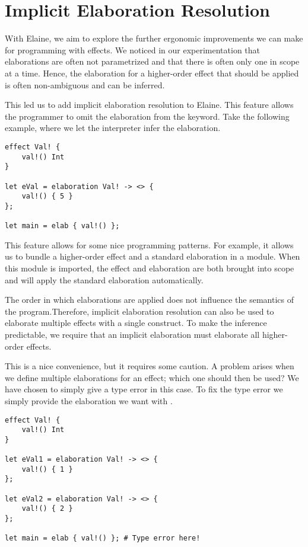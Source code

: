 \chapter{Implicit Elaboration Resolution}\label{chap:elabres}

With Elaine, we aim to explore the further ergonomic improvements we can make for programming with effects. We noticed in our experimentation that elaborations are often not parametrized and that there is often only one in scope at a time. Hence, the elaboration for a higher-order effect that should be applied is often non-ambiguous and can be inferred.

This led us to add implicit elaboration resolution to Elaine. This feature allows the programmer to omit the elaboration from the  keyword. Take the following example, where we let the interpreter infer the elaboration.

\begin{lstlisting}[language=elaine,style=fancy]
effect Val! {
    val!() Int
}

let eVal = elaboration Val! -> <> {
    val!() { 5 }
};

let main = elab { val!() };
\end{lstlisting}

This feature allows for some nice programming patterns. For example, it allows us to bundle a higher-order effect and a standard elaboration in a module. When this module is imported, the effect and elaboration are both brought into scope and  will apply the standard elaboration automatically.

The order in which elaborations are applied does not influence the semantics of the program.\citationneeded Therefore, implicit elaboration resolution can also be used to elaborate multiple effects with a single  construct. To make the inference predictable, we require that an implicit elaboration must elaborate all higher-order effects.

This is a nice convenience, but it requires some caution. A problem arises when we define multiple elaborations for an effect; which one should then be used? We have chosen to simply give a type error in this case. To fix the type error we simply provide the elaboration we want with .

\begin{lstlisting}[language=elaine,style=fancy]
effect Val! {
    val!() Int
}

let eVal1 = elaboration Val! -> <> {
    val!() { 1 }
};

let eVal2 = elaboration Val! -> <> {
    val!() { 2 }
};

let main = elab { val!() }; # Type error here!
\end{lstlisting}

